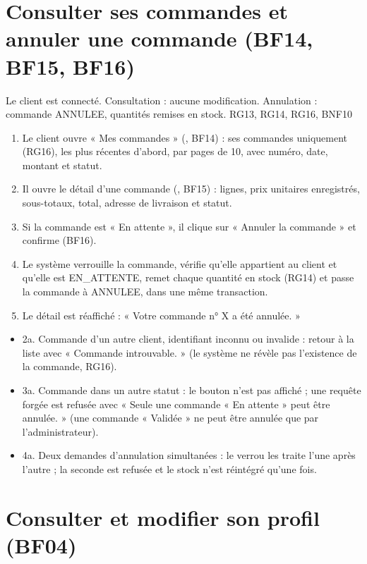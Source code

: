 \section{Consulter ses commandes et annuler une commande (BF14, BF15, BF16)}

  {Le client est connecté.}
  {Consultation : aucune modification. Annulation : commande ANNULEE, quantités remises en stock.}
  {RG13, RG14, RG16, BNF10}

\begin{enumerate}
  \item Le client ouvre « Mes commandes » (, BF14) : ses commandes uniquement (RG16), les plus
        récentes d'abord, par pages de 10, avec numéro, date, montant et statut.
  \item Il ouvre le détail d'une commande (, BF15) : lignes, prix unitaires enregistrés,
        sous-totaux, total, adresse de livraison et statut.
  \item Si la commande est « En attente », il clique sur « Annuler la commande » et confirme (BF16).
  \item Le système verrouille la commande, vérifie qu'elle appartient au client et qu'elle est EN\_ATTENTE, remet
        chaque quantité en stock (RG14) et passe la commande à ANNULEE, dans une même transaction.
  \item Le détail est réaffiché : « Votre commande n° X a été annulée. »
\end{enumerate}

\begin{itemize}
  \item 2a. Commande d'un autre client, identifiant inconnu ou invalide : retour à la liste avec « Commande
        introuvable. » (le système ne révèle pas l'existence de la commande, RG16).
  \item 3a. Commande dans un autre statut : le bouton n'est pas affiché ; une requête forgée est refusée avec
        « Seule une commande « En attente » peut être annulée. » (une commande « Validée » ne peut être annulée
        que par l'administrateur).
  \item 4a. Deux demandes d'annulation simultanées : le verrou les traite l'une après l'autre ; la seconde est
        refusée et le stock n'est réintégré qu'une fois.
\end{itemize}

\section{Consulter et modifier son profil (BF04)}

